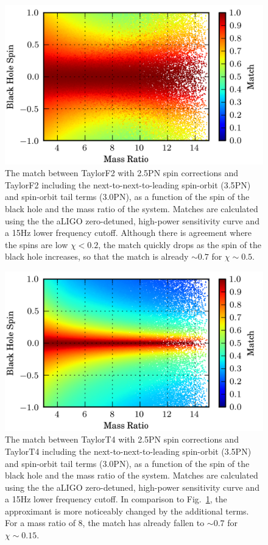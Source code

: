 \begin{figure}
\begin{center}
\includegraphics{papers/nsbh_faithfulness/figure4.png}
\end{center}
\caption{\label{fig:5715f2f2}The match between TaylorF2 with 2.5\ac{PN} spin corrections
and TaylorF2 including the next-to-next-to-leading spin-orbit (3.5\ac{PN}) and spin-orbit tail 
terms (3.0\ac{PN}), as a function of the spin of the black hole
and the mass ratio of the system. Matches are calculated using the the aLIGO
zero-detuned, high-power sensitivity curve and a 15Hz lower frequency cutoff. Although 
there is agreement where the spins are low $\chi < 0.2 $, the match quickly drops
as the spin of the black hole increases, so that the match is already $ \sim 0.7 $ for $\chi \sim 0.5$.
}
\end{figure}

\begin{figure}
\begin{center}
\includegraphics{papers/nsbh_faithfulness/figure5.png}
\end{center}
\caption{\label{fig:5715t4t4}The match between TaylorT4  with 2.5\ac{PN} spin corrections
and TaylorT4 including the next-to-next-to-leading spin-orbit (3.5\ac{PN}) and spin-orbit tail 
terms (3.0\ac{PN}), as a function of the spin of the black hole
and the mass ratio of the system. Matches are calculated using the the aLIGO
zero-detuned, high-power sensitivity curve and a 15Hz lower frequency cutoff. 
In comparison to Fig.~\ref{fig:5715f2f2}, the approximant is more noticeably changed
by the additional terms. For a mass ratio of 8, the match has already 
fallen to  $ \sim 0.7 $ for $\chi \sim 0.15$. }
\end{figure}

